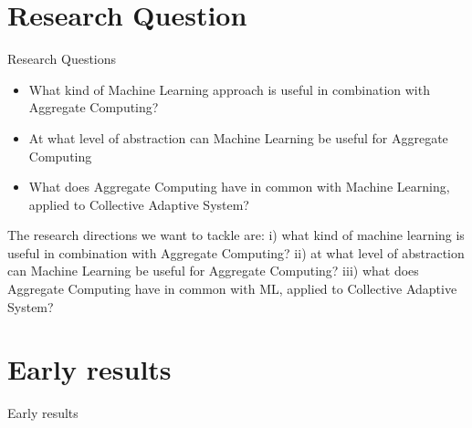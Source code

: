 \documentclass[aspectratio=169]{beamer}
\begin{document}
\section{Research Question}
\begin{frame}{Research Questions}
  \begin{card}
    \begin{itemize}
      \item <1-> What kind of Machine Learning approach is useful in combination with Aggregate Computing?
      \item <2-> At what level of abstraction can Machine Learning be useful for Aggregate Computing
      \item <3-> What does Aggregate Computing have in common with Machine Learning, applied to Collective Adaptive System?
    \end{itemize}  
  \end{card}
  \pdfcomment 
  {
    The research directions we want to tackle are: 
    i) what kind of machine learning is useful in combination with Aggregate Computing? 
    ii) at what level of abstraction can Machine Learning be useful for Aggregate Computing? 
    iii) what does Aggregate Computing have in common with ML, applied to Collective Adaptive System?
  }
\end{frame}
\section{Early results}
\begin{frame}{Early results}
\end{frame}
\end{document}
